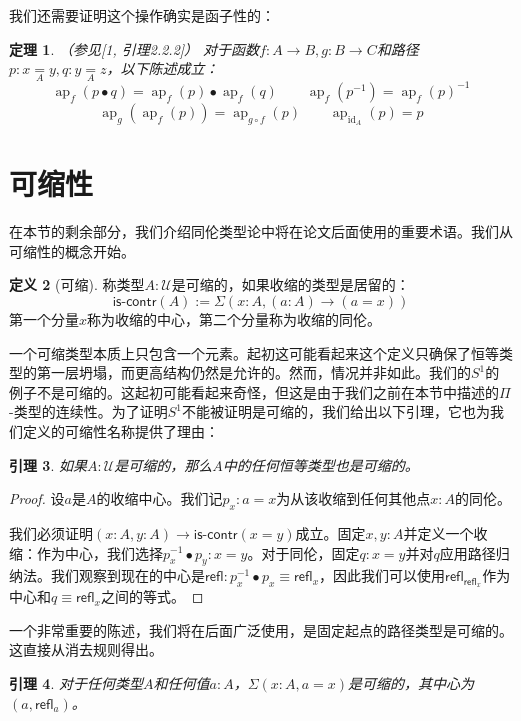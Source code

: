 \documentclass{ctexrep}
\theoremstyle{plain}
\newtheorem{theorem}{定理}[section]
\newtheorem{lemma}[theorem]{引理}
\theoremstyle{definition}
\newtheorem{definition}[theorem]{定义}
\theoremstyle{remark}
\theoremstyle{definition}
\theoremstyle{definition}
\theoremstyle{definition}
\newcommand{\coloneqq}{\mathrel{:=}}
\newcommand{\ap}{\operatorname{ap}}
\newcommand{\refl}{\mathsf{refl}}
\newcommand{\id}{\operatorname{id}}
\newcommand{\iscontr}{\mathsf{is\text{-}contr}}
\newcommand{\UU}{\mathcal{U}}
\begin{document}
我们还需要证明这个操作确实是函子性的：

\begin{theorem}（参见[1, 引理2.2.2]）
对于函数$f:A\to B,g:B\to C$和路径$p:x\underset{A}{=} y,q:y\underset{A}{=} z$，以下陈述成立：
\[
\ap_f(p\bullet q) = \ap_f(p)\bullet\ap_f(q) \qquad \ap_f(p^{-1}) = \ap_f(p)^{-1}
\]
\[
\ap_g(\ap_f(p)) = \ap_{g\circ f}(p) \qquad \ap_{\id_A}(p) = p
\]
\end{theorem}

\section{可缩性}

在本节的剩余部分，我们介绍同伦类型论中将在论文后面使用的重要术语。我们从可缩性的概念开始。

\begin{definition}[可缩]
称类型$A:\UU$是可缩的，如果收缩的类型是居留的：
\[
\iscontr(A)\coloneqq \Sigma(x:A,(a:A)\to(a=x))
\]
第一个分量$x$称为收缩的中心，第二个分量称为收缩的同伦。
\end{definition}

一个可缩类型本质上只包含一个元素。起初这可能看起来这个定义只确保了恒等类型的第一层坍塌，而更高结构仍然是允许的。然而，情况并非如此。我们的$S^1$的例子不是可缩的。这起初可能看起来奇怪，但这是由于我们之前在本节中描述的$\Pi$-类型的连续性。为了证明$S^1$不能被证明是可缩的，我们给出以下引理，它也为我们定义的可缩性名称提供了理由：

\begin{lemma}
如果$A:\UU$是可缩的，那么$A$中的任何恒等类型也是可缩的。
\end{lemma}

\begin{proof}
设$a$是$A$的收缩中心。我们记$p_x:a=x$为从该收缩到任何其他点$x:A$的同伦。

我们必须证明$(x:A,y:A)\to\iscontr(x=y)$成立。固定$x,y:A$并定义一个收缩：作为中心，我们选择$p_x^{-1}\bullet p_y:x=y$。对于同伦，固定$q:x=y$并对$q$应用路径归纳法。我们观察到现在的中心是$\refl:p_x^{-1}\bullet p_x\equiv\refl_x$，因此我们可以使用$\refl_{\refl_x}$作为中心和$q\equiv\refl_x$之间的等式。
\end{proof}

一个非常重要的陈述，我们将在后面广泛使用，是固定起点的路径类型是可缩的。这直接从消去规则得出。

\begin{lemma}
对于任何类型$A$和任何值$a:A$，$\Sigma(x:A,a=x)$是可缩的，其中心为$(a,\refl_a)$。
\end{lemma}
\end{document}
